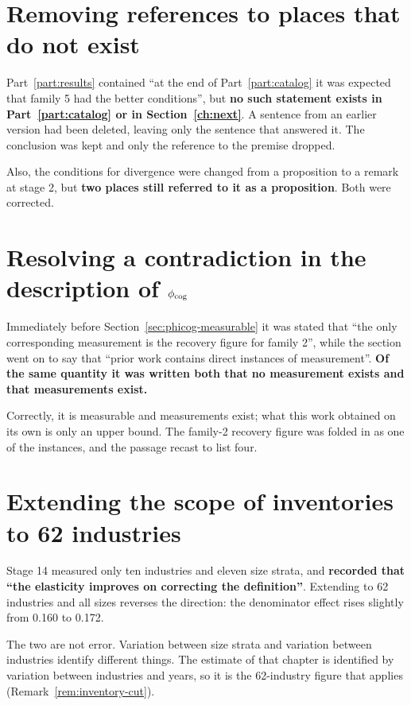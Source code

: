 \section{Removing references to places that do not exist}

Part~\ref{part:results} contained ``at the end of Part~\ref{part:catalog} it was expected that
family 5 had the better conditions'', but \textbf{no such statement exists in
Part~\ref{part:catalog} or in Section~\ref{ch:next}}. A sentence from an earlier version had been
deleted, leaving only the sentence that answered it. The conclusion was kept and only the reference
to the premise dropped.

Also, the conditions for divergence were changed from a proposition to a remark at stage 2, but
\textbf{two places still referred to it as a proposition}. Both were corrected.

\section{Resolving a contradiction in the description of \texorpdfstring{$\phi_{\rm cog}$}{phi-cog}}

Immediately before Section~\ref{sec:phicog-measurable} it was stated that ``the only corresponding
measurement is the recovery figure for family 2'', while the section went on to say that ``prior
work contains direct instances of measurement''. \textbf{Of the same quantity it was written both
that no measurement exists and that measurements exist.}

Correctly, it is measurable and measurements exist; what this work obtained on its own is only an
upper bound. The family-2 recovery figure was folded in as one of the instances, and the passage
recast to list four.

\section{Extending the scope of inventories to 62 industries}

Stage 14 measured only ten industries and eleven size strata, and \textbf{recorded that ``the
elasticity improves on correcting the definition''}. Extending to 62 industries and all sizes
reverses the direction: the denominator effect rises slightly from 0.160 to 0.172.

The two are not error. Variation between size strata and variation between industries identify
different things. The estimate of that chapter is identified by variation between industries and
years, so it is the 62-industry figure that applies (Remark~\ref{rem:inventory-cut}).


